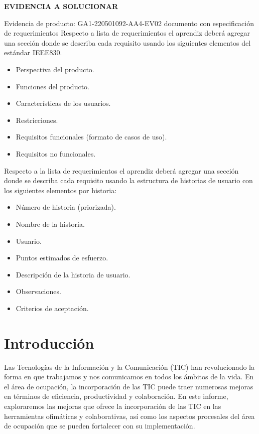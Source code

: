 \documentclass{article}
\theoremstyle{mytheoremstyle}
\theoremstyle{mytheoremstyle}
\theoremstyle{myproblemstyle}
\begin{document}
\begin{flushleft}
    \large \textbf{EVIDENCIA A SOLUCIONAR}\\
    \vspace{1cm}
    
    \large Evidencia de producto: GA1-220501092-AA4-EV02 documento con especificación de requerimientos
    Respecto a lista de requerimientos el aprendiz deberá agregar una sección donde se describa cada requisito usando los siguientes elementos del estándar IEEE830.
    \begin{itemize}
    \item Perspectiva del producto.
    \item Funciones del producto.
    \item Características de los usuarios.
    \item Restricciones.
    \item Requisitos funcionales (formato de casos de uso).
    \item Requisitos no funcionales.
    \end{itemize}
    Respecto a la lista de requerimientos el aprendiz deberá agregar una sección donde se describa cada requisito usando la estructura de historias de usuario con los siguientes elementos por historia:
    \begin{itemize}
    \item Número de historia (priorizada).
    \item Nombre de la historia.
    \item Usuario.
    \item Puntos estimados de esfuerzo.
    \item Descripción de la historia de usuario.
    \item Observaciones.
    \item Criterios de aceptación.
    \end{itemize}
    \end{flushleft}
    \newpage


\section{Introducción}

Las Tecnologías de la Información y la Comunicación (TIC) han revolucionado la forma en que trabajamos y nos comunicamos en todos los ámbitos de la vida. En el área de ocupación, la incorporación de las TIC puede traer numerosas mejoras en términos de eficiencia, productividad y colaboración. En este informe, exploraremos las mejoras que ofrece la incorporación de las TIC en las herramientas ofimáticas y colaborativas, así como los aspectos procesales del área de ocupación que se pueden fortalecer con su implementación.
\end{document}
